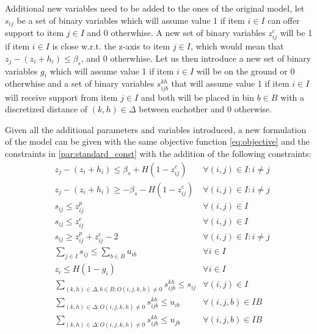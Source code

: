 Additional new variables need to be added to the ones of the original model, let $s_{ij}$ be a set of binary variables which will assume value 1 if item $i \in I$ can offer support to item $j \in I$ and 0 otherwhise. A new set of binary variables $z^c_{ij}$ will be 1 if item $i \in I$ is close w.r.t. the z-axis to item $j \in I$, which would mean that $z_j - (z_i + h_i) \le \beta_s$, and 0 otherwhise.
Let us then introduce a new set of binary variables $g_i$ which will assume value 1 if item $i \in I$ will be on the ground or 0 otherwhise and a set of binary variables $s^{kh}_{i j b}$ that will assume value 1 if item $i \in I$ will receive support from item $j \in I$ and both will be placed in bin $b \in B$ with a discretized distance of $(k, h) \in \Delta$ between eachother and 0 otherwise.

Given all the additional parameters and variables introduced, a new formulation of the model can be given with the same objective function \ref{eq:objective} and the constraints in \cref{par:standard_const} with the addition of the following constraints:
\label{par:support_const}
\begin{align}
    & z_j - (z_i + h_i) \le \beta_s + H (1 - z^c_{ij}) & \forall (i, j) \in I : i \neq j \label{cons:z_close_1} \\
    & z_j - (z_i + h_i) \ge -\beta_s - H (1 - z^c_{ij}) & \forall (i, j) \in I : i \neq j \label{cons:z_close_2} \\
    & s_{ij} \le z^p_{ij} & \forall (i, j) \in I  \label{cons:supporting_1} \\
    & s_{ij} \le z^c_{ij} & \forall (i, j) \in I  \label{cons:supporting_2} \\
    & s_{ij} \ge z^p_{ij} + z^c_{ij} - 2 & \forall (i, j) \in I : i \neq j \label{cons:supporting} \\
    & \sum\limits_{j \in I}{s_{ij}} \le \sum\limits_{b \in B}{u_{ib}} & \forall i \in I  \label{cons:support_comes_from_placed} \\
    & z_i \le H(1 - g_i) & \forall i \in I \label{cons:grounded} \\
    & \sum\limits_{(k, h) \in \Delta, b \in B : O(i, j, k, h) \neq 0} s^{k h}_{i j b} \le s_{ij} & \forall (i, j) \in I \label{cons:discretized_support_same} \\
    & \sum\limits_{(k, h) \in \Delta : O(i, j, k, h) \neq 0} s^{k h}_{i j b} \le u_{ib} & \forall (i, j, b) \in IB \label{cons:discretized_support_right_bin_i} \\
    & \sum\limits_{(k, h) \in \Delta : O(i, j, k, h) \neq 0} s^{k h}_{i j b} \le u_{jb} & \forall (i, j, b) \in IB \label{cons:discretized_support_right_bin_j}
\end{align}
